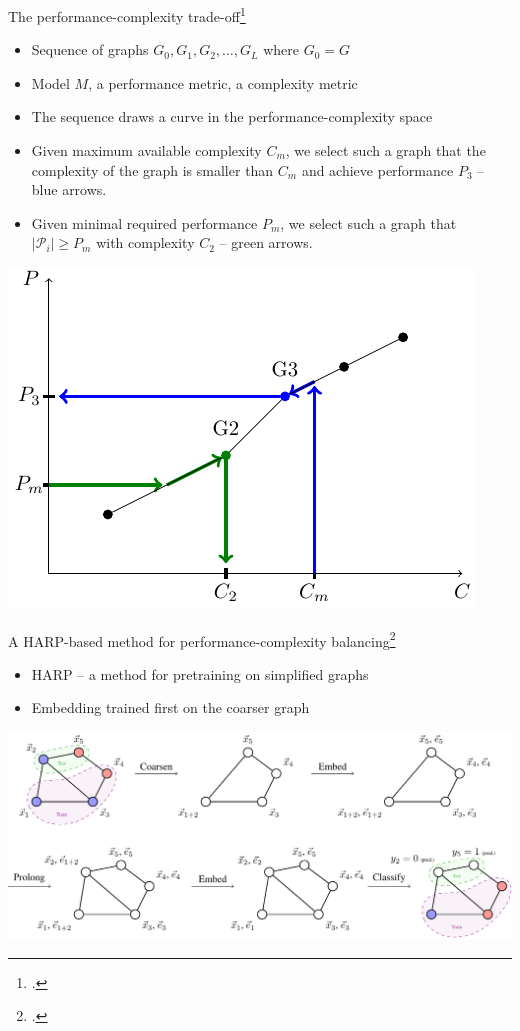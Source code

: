 \documentclass[10pt]{beamer}
\begin{document}
\begin{frame}{The performance-complexity trade-off\footcite{prochazka_scalable_2022, dedic_balancing_2023, dedic_balancing_2024}}
	\begin{itemize}
		\item<1|only@1> Sequence of graphs \( G_0, G_1, G_2, \dots, G_L \) where \( G_0 = G \)
		\item<1|only@1> Model \( M \), a performance metric, a complexity metric
		\item<1|only@1> The sequence draws a curve in the performance-complexity space
		\item<2|only@2> Given maximum available complexity $C_m$, we select such a graph that the complexity of the graph is smaller than $C_m$ and achieve performance $P_3$ -- blue arrows.
		\item<2|only@2> Given minimal required performance $P_m$, we select such a graph that $|\mathcal{P}_i|\ge P_m$ with complexity $C_2$ -- green arrows.
	\end{itemize}

	\vfill

	\centering
	\includegraphics[width=0.6\linewidth]{images/performance-complexity-schema/performance-complexity-schema.pdf}
\end{frame}

\begin{frame}{A HARP-based method for performance-complexity balancing\footcite{dedic_balancing_2024}}
	\begin{itemize}
		\item HARP -- a method for pretraining on simplified graphs
		\item Embedding trained first on the coarser graph
	\end{itemize}

	\vfill

	\centering
	\includegraphics[width=0.9\linewidth]{images/harp-overview/harp-overview.pdf}
\end{frame}
\end{document}
